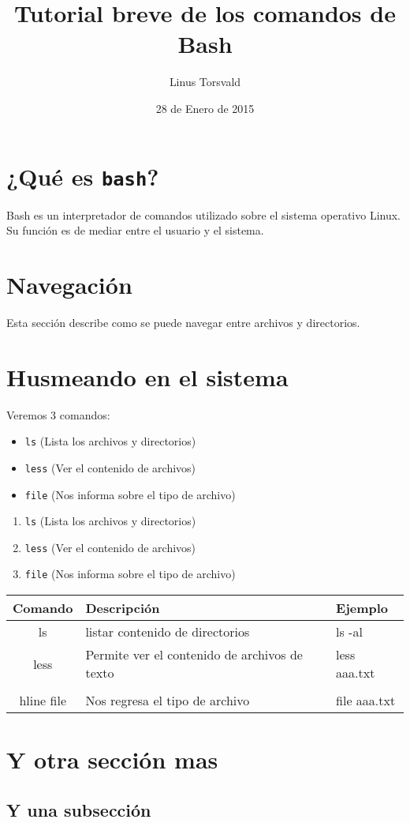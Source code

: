 \documentclass[12pt]{article}
\title{Tutorial breve de los comandos de Bash}
\author{Linus Torsvald}
\date{28 de Enero de 2015}
\begin{document}
\maketitle

\section{¿Qué es {\tt bash}?}

Bash es un interpretador de comandos utilizado sobre el sistema operativo Linux.
Su función es de mediar entre el usuario y el sistema.

\section{Navegación}

Esta sección describe como se puede navegar entre archivos y directorios.

\section{Husmeando en el sistema}

Veremos 3 comandos:

\begin{itemize}
\item {\tt ls} (Lista los archivos y directorios) 
\item {\tt less} (Ver el contenido de archivos)
\item {\tt file} (Nos informa sobre el tipo de archivo)
\end{itemize}


\begin{enumerate}
\item {\tt ls} (Lista los archivos y directorios) 
\item {\tt less} (Ver el contenido de archivos)
\item {\tt file} (Nos informa sobre el tipo de archivo)
\end{enumerate}

\begin{tabular}{|c|l|l|}
\hline
Comando & Descripción & Ejemplo \\
\hline
ls & listar contenido de directorios & ls -al \\ \hline
less & Permite ver el contenido de archivos de texto & less aaa.txt \\ \\hline
file & Nos regresa el tipo de archivo & file aaa.txt \\
\hline
\end{tabular} 

\section{Y otra sección mas}
\subsection{Y una subsección}


\end{document}
